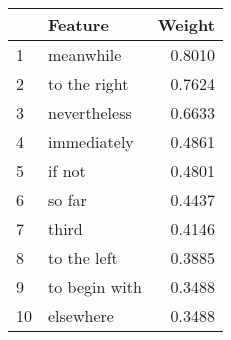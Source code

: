 \begin{tabular}{llr}
\toprule
{} &        Feature &  Weight \\
\midrule
1  &      meanwhile &  0.8010 \\
2  &   to the right &  0.7624 \\
3  &   nevertheless &  0.6633 \\
4  &    immediately &  0.4861 \\
5  &         if not &  0.4801 \\
6  &         so far &  0.4437 \\
7  &          third &  0.4146 \\
8  &    to the left &  0.3885 \\
9  &  to begin with &  0.3488 \\
10 &      elsewhere &  0.3488 \\
\bottomrule
\end{tabular}
